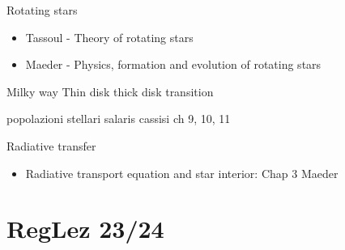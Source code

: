 \begin{frame}{Rotating stars}
\begin{itemize}
\item Tassoul - Theory of rotating stars
\item Maeder - Physics, formation and evolution of rotating stars
\end{itemize}
\end{frame}

\begin{frame}{Milky way}
Thin disk thick disk transition
\end{frame}

\begin{frame}{popolazioni stellari}
salaris cassisi ch 9, 10, 11
\end{frame}

\begin{frame}{Radiative transfer}
    \begin{itemize}
        \item Radiative transport equation and star interior: Chap 3 Maeder
    \end{itemize}
\end{frame}
\section{RegLez 23/24}

